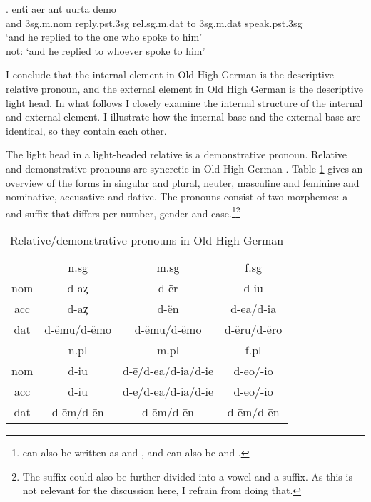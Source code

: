 \exg. enti aer {ant uurta} demo  \\
and 3\ac{sg}.\ac{m}.\ac{nom} reply.\ac{pst}.3\ac{sg}\scsub{[dat]} \ac{rel}.\ac{sg}.\ac{m}.\ac{dat} {to 3\ac{sg}.\ac{m}.\ac{dat}} speak.\ac{pst}.3\ac{sg}\scsub{[nom]}\\
`and he replied to the one who spoke to him'\\
not: `and he replied to whoever spoke to him'
 \label{ex:ohg-dat-nom-rep}

I conclude that the internal element in Old High German is the descriptive relative pronoun, and the external element in Old High German is the descriptive light head. In what follows I closely examine the internal structure of the internal and external element. I illustrate how the internal base and the external base are identical, so they contain each other.

The light head in a light-headed relative is a demonstrative pronoun. Relative and demonstrative pronouns are syncretic in Old High German . Table \ref{tbl:rel-dem-ohg} gives an overview of the forms in singular and plural, neuter, masculine and feminine and nominative, accusative and dative. The pronouns consist of two morphemes: a  and suffix that differs per number, gender and case.\footnote{
 can also be written as  and ,  and  can also be  and  .
}\footnote{
The suffix could also be further divided into a vowel and a suffix. As this is not relevant for the discussion here, I refrain from doing that.
}

\begin{table}[H]\label{tbl:rel-dem-ohg}
 \center
 \caption {Relative/demonstrative pronouns in Old High German }
  \begin{tabular}{cccc}
  \toprule
            & \ac{n}.\ac{sg}  & \ac{m}.\ac{sg}      & \ac{f}.\ac{sg}    \\
        \cmidrule{2-4}
  \ac{nom}  & d-aȥ            & d-ër                & d-iu               \\
  \ac{acc}  & d-aȥ            & d-ën                & d-ea/d-ia         \\
  \ac{dat}  & d-ëmu/d-ëmo     & d-ëmu/d-ëmo         & d-ëru/d-ëro       \\
  \bottomrule
            & \ac{n}.\ac{pl}  & \ac{m}.\ac{pl}      &  \ac{f}.\ac{pl}  \\
        \cmidrule{2-4}
  \ac{nom}  & d-iu            &  d-ē/d-ea/d-ia/d-ie & d-eo/-io         \\
  \ac{acc}  & d-iu            &  d-ē/d-ea/d-ia/d-ie & d-eo/-io         \\
  \ac{dat}  & d-ēm/d-ēn       &  d-ēm/d-ēn          & d-ēm/d-ēn        \\
    \bottomrule
  \end{tabular}
\end{table}

